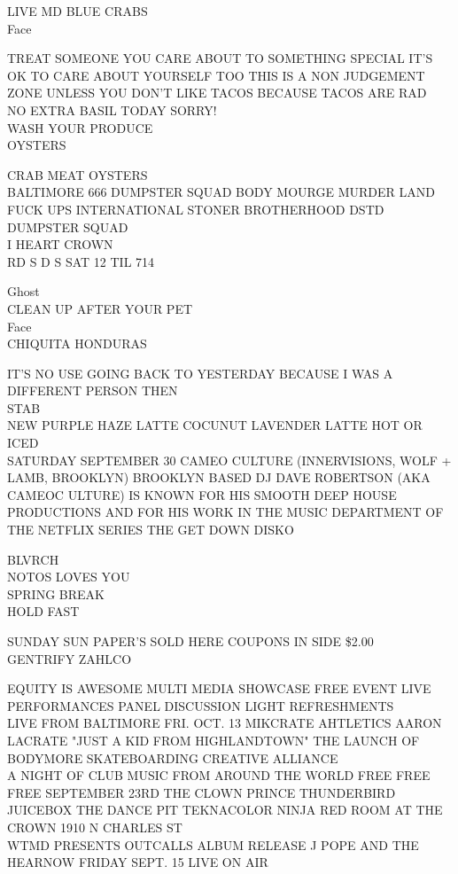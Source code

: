 \documentclass[10pt,letterpaper]{article}
\begin{document}
LIVE MD BLUE CRABS\\
Face

TREAT SOMEONE YOU CARE ABOUT TO SOMETHING SPECIAL IT'S OK TO CARE ABOUT YOURSELF TOO THIS IS A NON JUDGEMENT ZONE UNLESS YOU DON'T LIKE TACOS BECAUSE TACOS ARE RAD\\
NO EXTRA BASIL TODAY SORRY!\\
WASH YOUR PRODUCE\\
OYSTERS

CRAB MEAT OYSTERS\\
BALTIMORE 666 DUMPSTER SQUAD BODY MOURGE MURDER LAND FUCK UPS INTERNATIONAL STONER BROTHERHOOD DSTD DUMPSTER SQUAD\\
I HEART CROWN\\
RD S D S SAT 12 TIL 714

Ghost\\
CLEAN UP AFTER YOUR PET\\
Face\\
CHIQUITA HONDURAS

IT'S NO USE GOING BACK TO YESTERDAY BECAUSE I WAS A DIFFERENT PERSON THEN\\
STAB\\
NEW PURPLE HAZE LATTE COCUNUT LAVENDER LATTE HOT OR ICED\\
SATURDAY SEPTEMBER 30 CAMEO CULTURE (INNERVISIONS, WOLF + LAMB, BROOKLYN) BROOKLYN BASED DJ DAVE ROBERTSON (AKA CAMEOC ULTURE) IS KNOWN FOR HIS SMOOTH DEEP HOUSE PRODUCTIONS AND FOR HIS WORK IN THE MUSIC DEPARTMENT OF THE NETFLIX SERIES THE GET DOWN DISKO

BLVRCH\\
NOTOS LOVES YOU\\
SPRING BREAK\\
HOLD FAST

SUNDAY SUN PAPER'S SOLD HERE COUPONS IN SIDE \$2.00\\
GENTRIFY ZAHLCO

EQUITY IS AWESOME MULTI MEDIA SHOWCASE FREE EVENT LIVE PERFORMANCES PANEL DISCUSSION LIGHT REFRESHMENTS\\
LIVE FROM BALTIMORE FRI. OCT. 13 MIKCRATE AHTLETICS AARON LACRATE "JUST A KID FROM HIGHLANDTOWN" THE LAUNCH OF BODYMORE SKATEBOARDING CREATIVE ALLIANCE\\
A NIGHT OF CLUB MUSIC FROM AROUND THE WORLD FREE FREE FREE SEPTEMBER 23RD THE CLOWN PRINCE THUNDERBIRD JUICEBOX THE DANCE PIT TEKNACOLOR NINJA RED ROOM AT THE CROWN 1910 N CHARLES ST\\
WTMD PRESENTS OUTCALLS ALBUM RELEASE J POPE AND THE HEARNOW FRIDAY SEPT. 15 LIVE ON AIR
\end{document}
